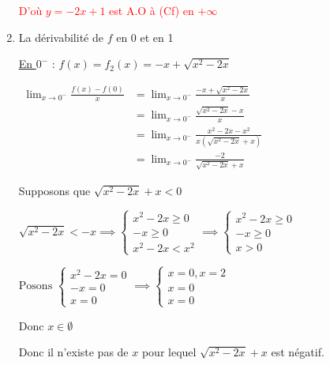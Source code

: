 \documentclass[12pt,a4paper]{article}
\begin{document}
\begin{enumerate}
\textcolor{red}{D'où $ y=-2x+1 $ est A.O à (Cf) en $ +\infty $}
\item La dérivabilité de $f$ en 0 et en 1

\underline{En \( 0^{-} \)} : \( f(x) = f_{2}(x) = -x + \sqrt{x^2 - 2x} \) 

$
\begin{aligned}
\lim_{x \to 0^{-}} \frac{f(x)-f(0)}{x} &= \lim_{x \to 0^{-}} \frac{-x + \sqrt{x^2 - 2x}}{x}\\
																					&= \lim_{x \to 0^{-}} \frac{\sqrt{x^2 - 2x} - x }{x}\\
																				 &= \lim_{x \to 0^{-}} \frac{x^{2} - 2x - x^{2}}{x(\sqrt{x^2 - 2x}+x)}\\
																				 &= \lim_{x \to 0^{-}} \frac{ - 2}{\sqrt{x^2 - 2x}+x}
\end{aligned}
$

Supposons que $ \sqrt{x^2 - 2x}+x < 0 $

$
\sqrt{x^2 - 2x} < -x \implies
\begin{cases}
x^2 - 2x \geq 0 \\
-x \geq 0 \\
x^2 - 2x < x^{2}
\end{cases}
\implies
\begin{cases}
x^2 - 2x \geq 0 \\
-x \geq 0 \\
x > 0
\end{cases}
$

$
\text{Posons }
\begin{cases}
x^2 - 2x = 0 \\
-x = 0 \\
x = 0
\end{cases}
\implies
\begin{cases}
x = 0, x = 2 \\
x = 0 \\
x = 0
\end{cases}
$


Donc $x \in \emptyset $ 

Donc il n'existe pas de $x$ pour lequel $\sqrt{x^2 - 2x}+x$ est négatif. 


\end{enumerate}
\end{document}

